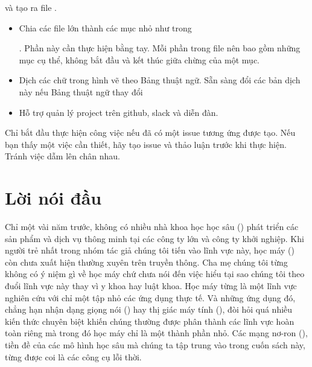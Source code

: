 \documentclass[letterpaper,11pt,english]{sphinxmanual}
\begin{document}
và tạo ra file .
\begin{itemize}
\item {} 
Chia các file lớn thành các mục nhỏ như trong %
\begin{footnote}[16]\sphinxAtStartFootnote
{}
%
\end{footnote}.
Phần này cần thực hiện bằng tay. Mỗi phần trong file nên bao gồm
những mục cụ thể, không bắt đầu và kết thúc giữa chừng của một mục.

\item {} 
Dịch các chữ trong hình vẽ theo Bảng thuật ngữ. Sẵn sàng đổi các bản
dịch này nếu Bảng thuật ngữ thay đổi

\item {} 
Hỗ trợ quản lý project trên github, slack và diễn đàn.

\end{itemize}

 Chỉ bắt đầu thực hiện công việc nếu đã có một issue tương ứng
được tạo. Nếu bạn thấy một việc cần thiết, hãy tạo issue và thảo luận
trước khi thực hiện. Tránh việc dẫm lên chân nhau.






\chapter{Lời nói đầu}
\label{\detokenize{chapter_preface/index_vn:loi-noi-dau}}\label{\detokenize{chapter_preface/index_vn::doc}}


Chỉ một vài năm trước, không có nhiều nhà khoa học học sâu () phát triển các sản phẩm và dịch vụ thông minh tại các công ty
lớn và công ty khởi nghiệp. Khi người trẻ nhất trong nhóm tác giả chúng
tôi tiến vào lĩnh vực này, học máy () còn chưa xuất
hiện thường xuyên trên truyền thông. Cha mẹ chúng tôi từng không có ý
niệm gì về học máy chứ chưa nói đến việc hiểu tại sao chúng tôi theo
đuổi lĩnh vực này thay vì y khoa hay luật khoa. Học máy từng là một lĩnh
vực nghiên cứu với chỉ một tập nhỏ các ứng dụng thực tế. Và những ứng
dụng đó, chẳng hạn nhận dạng giọng nói () hay thị
giác máy tính (), đòi hỏi quá nhiều kiến thức chuyên
biệt khiến chúng thường được phân thành các lĩnh vực hoàn toàn riêng mà
trong đó học máy chỉ là một thành phần nhỏ. Các mạng nơ-ron (), tiền đề của các mô hình học sâu mà chúng ta tập trung vào
trong cuốn sách này, từng được coi là các công cụ lỗi thời.
\end{document}
